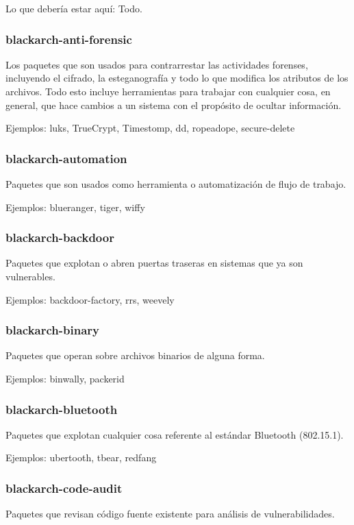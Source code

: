\documentclass[a4paper, oneside, 11pt]{book}
\begin{document}
Lo que debería estar aquí: Todo.

\subsubsection{blackarch-anti-forensic}
Los paquetes que son usados para contrarrestar las actividades forenses,
incluyendo el cifrado, la esteganografía y todo lo que modifica los atributos de los archivos.
Todo esto incluye herramientas para trabajar con cualquier cosa, en general, que hace cambios a un sistema
con el propósito de ocultar información.

Ejemplos: luks, TrueCrypt, Timestomp, dd, ropeadope, secure-delete

\subsubsection{blackarch-automation}
Paquetes que son usados como herramienta o automatización de flujo de trabajo.

Ejemplos: blueranger, tiger, wiffy

\subsubsection{blackarch-backdoor}
Paquetes que explotan o abren puertas traseras en sistemas que ya son vulnerables.

Ejemplos: backdoor-factory, rrs, weevely

\subsubsection{blackarch-binary}
Paquetes que operan sobre archivos binarios de alguna forma.

Ejemplos: binwally, packerid

\subsubsection{blackarch-bluetooth}
Paquetes que explotan cualquier cosa referente al estándar Bluetooth (802.15.1).

Ejemplos: ubertooth, tbear, redfang

\subsubsection{blackarch-code-audit}
Paquetes que revisan código fuente existente para análisis de vulnerabilidades.
\end{document}
